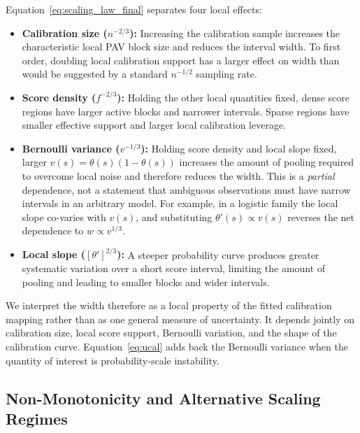 \documentclass[11pt]{article}
\begin{document}
	Equation~\ref{eq:scaling_law_final} separates four local effects:
	\begin{itemize}
		\item \textbf{Calibration size ($n^{-2/3}$):} Increasing the calibration sample increases the characteristic local PAV block size and reduces the interval width. To first order, doubling local calibration support has a larger effect on width than would be suggested by a standard $n^{-1/2}$ sampling rate.
		\item \textbf{Score density ($f^{-2/3}$):} Holding the other local quantities fixed, dense score regions have larger active blocks and narrower intervals. Sparse regions have smaller effective support and larger local calibration leverage.
		\item \textbf{Bernoulli variance ($v^{-1/3}$):} Holding score density and local slope fixed, larger $v(s)=\theta(s)(1-\theta(s))$ increases the amount of pooling required to overcome local noise and therefore reduces the width. This is a \emph{partial} dependence, not a statement that ambiguous observations must have narrow intervals in an arbitrary model. For example, in a logistic family the local slope co-varies with $v(s)$, and substituting $\theta'(s)\propto v(s)$ reverses the net dependence to $w\propto v^{1/3}$.
		\item \textbf{Local slope ($[\theta']^{2/3}$):} A steeper probability curve produces greater systematic variation over a short score interval, limiting the amount of pooling and leading to smaller blocks and wider intervals.
	\end{itemize}
	
	We interpret the width therefore as a local property of the fitted calibration mapping rather than as one general measure of uncertainty. It depends jointly on calibration size, local score support, Bernoulli variation, and the shape of the calibration curve. Equation~\ref{eq:ucal} adds back the Bernoulli variance when the quantity of interest is probability-scale instability.
	
	\subsection{Non-Monotonicity and Alternative Scaling Regimes}
	\label{subsec:non_monotonic_theory}
	
\end{document}
